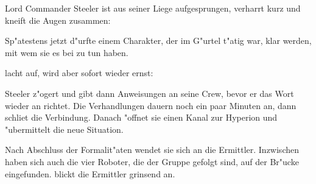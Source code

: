 
Lord Commander Steeler ist aus seiner Liege aufgesprungen, verharrt kurz und kneift die Augen zusammen:


Sp"atestens jetzt d"urfte einem Charakter, der im G"urtel t"atig war, klar werden, mit wem sie es bei \xl{} zu tun haben.

\xl{} lacht auf, wird aber sofort wieder ernst:


Steeler z"ogert und gibt dann Anweisungen an seine Crew, bevor er das Wort wieder an \xl{} richtet. Die Verhandlungen dauern noch ein paar Minuten an, dann schlie\3t \xl{} die Verbindung. Danach "offnet sie einen Kanal zur Hyperion und "ubermittelt die neue Situation.

Nach Abschluss der Formalit"aten wendet sie sich an die Ermittler. Inzwischen haben sich auch die vier Roboter, die der Gruppe gefolgt sind, auf der Br"ucke eingefunden. \xl{} blickt die Ermittler grinsend an.



